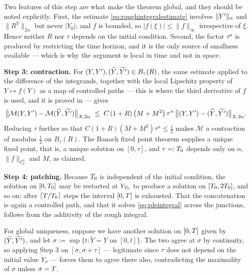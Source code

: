 Two features of this step are what make the theorem global, and they should be noted explicitly.
First, the estimate \eqref{eq:roughintegralestimate} involves $\lVert Y'\rVert_\alpha$ and
$\lVert R^Y\rVert_{2\alpha}$ but never $|Y_0|$; and $f$ is bounded, so $|f(\xi)|\leq\lVert f\rVert_\infty$
irrespective of $\xi$. Hence neither $R$ nor $\tau$ depends on the initial condition. Second, the
factor $\tau^{\alpha}$ is produced by restricting the time horizon, and it is the only source of
smallness available --- which is why the argument is local in time and not in space.

\medskip
\noindent\textbf{Step 3: contraction.} For $(Y,Y'),(\widetilde Y,\widetilde{Y'}) \in B_\tau(R)$,
the same estimate applied to the difference of the integrands, together with the local Lipschitz
property of $Y\mapsto f(Y)$ as a map of controlled paths --- this is where the third derivative of
$f$ is used, and it is proved in \cite[Lem.\ 7.3]{frizhairer2020} --- gives
\[
\bigl\lVert \mathcal{M}(Y,Y')-\mathcal{M}(\widetilde Y,\widetilde{Y'})\bigr\rVert_{X,2\alpha}
\;\leq\; C\,(1+R)\,\bigl(M+M^{2}\bigr)\,\tau^{\alpha}\,\bigl\lVert (Y,Y')-(\widetilde Y,\widetilde{Y'})\bigr\rVert_{X,2\alpha}.
\]
Reducing $\tau$ further so that $C(1+R)(M+M^{2})\tau^{\alpha}\leq\tfrac12$ makes $\mathcal{M}$ a contraction
of modulus $\tfrac12$ on $B_\tau(R)$. The Banach fixed point theorem supplies a unique fixed point,
that is, a unique solution on $[0,\tau]$, and $\tau =: T_0$ depends only on $\alpha$,
$\lVert f\rVert_{\mathcal{C}^3_b}$ and $M$, as claimed.

\medskip
\noindent\textbf{Step 4: patching.} Because $T_0$ is independent of the initial condition, the
solution on $[0,T_0]$ may be restarted at $Y_{T_0}$ to produce a solution on
$[T_0, 2T_0]$, and so on; after $\lceil T/T_0\rceil$ steps the interval $[0,T]$ is
exhausted. That the concatenation is again a controlled path, and that it solves
\eqref{eq:rdeintegral} across the junctions, follows from the additivity of the rough integral.

For global uniqueness, suppose we have another solution on  $[0,T]$ given by $(\widetilde Y,\widetilde{Y'})$, and
let $\sigma := \sup\{t : \widetilde Y = Y \text{ on } [0,t]\}$. The two agree at $\sigma$ by
continuity, so applying Step 3 on $[\sigma,\sigma+\tau]$ --- legitimate since $\tau$ does not depend
on the initial value $Y_\sigma$ --- forces them to agree there also, contradicting the maximality of
$\sigma$ unless $\sigma=T$. \qedfilledtext

